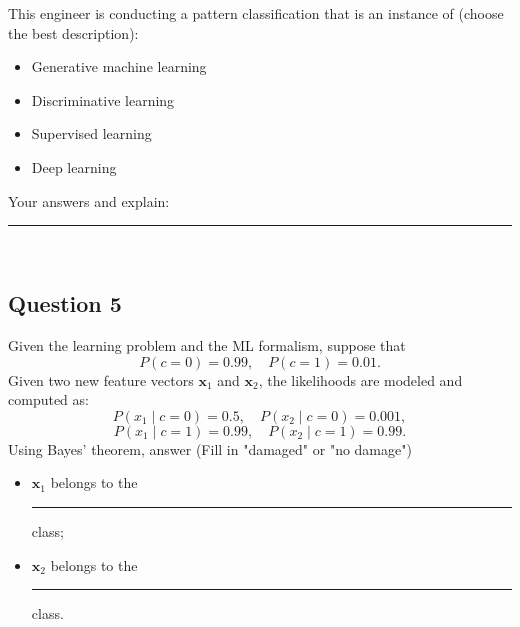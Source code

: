 \documentclass[12pt]{article}
\begin{document}
This engineer is conducting a pattern classification that is an instance of (choose the best description):
\begin{itemize}
    \item [A.] Generative machine learning
    \item [B.] Discriminative learning
    \item [C.] Supervised learning
    \item [C.] Deep learning
\end{itemize}
Your answers and explain: \rule{1in}{0.15mm}\\
\fullunderline 

\bigskip

\subsection*{Question 5} 

Given the learning problem and the ML formalism, suppose that
\[
P(c=0)=0.99, \quad P(c=1)=0.01.
\]
Given two new feature vectors \(\bm{x}_1\) and \(\bm{x}_2\), the likelihoods are modeled and computed as:
\[
P(x_1\mid c=0)=0.5, \quad P(x_2\mid c=0)=0.001,
\]
\[
P(x_1\mid c=1)=0.99, \quad P(x_2\mid c=1)=0.99.
\]
Using Bayes' theorem, answer (Fill in "damaged" or "no damage")
\begin{itemize}

    \item \(\bm{x}_1\) belongs to the \rule{1in}{0.15mm} class; 
    \item \(\bm{x}_2\) belongs to the \rule{1in}{0.15mm} class. 
 \end{itemize}



\end{document}
